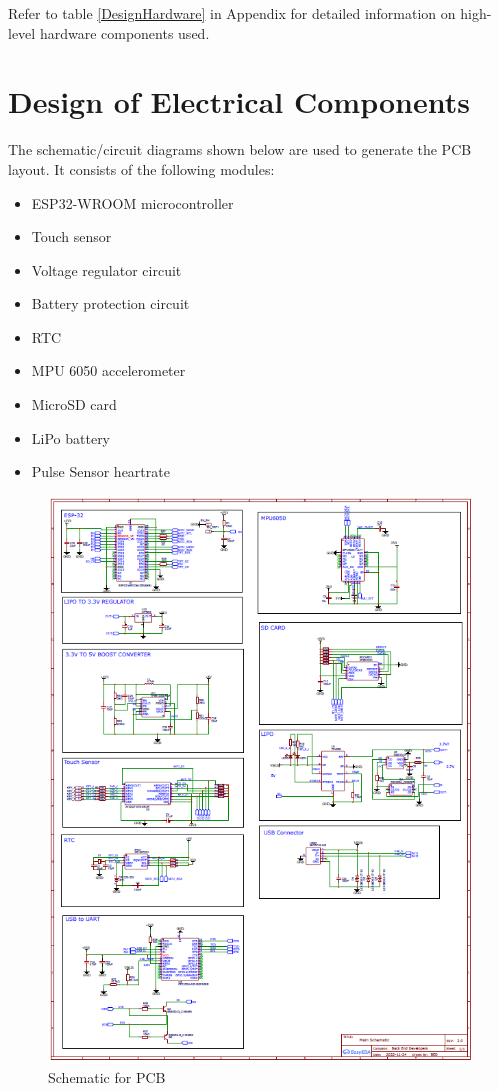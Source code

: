 \documentclass[12pt, titlepage]{article}
\begin{document}
Refer to table \ref{DesignHardware} in Appendix for detailed information on high-level hardware components used.

\section{Design of Electrical Components} \label{dEC}

The schematic/circuit diagrams shown below are used to generate the PCB layout. It consists of the following modules:
\begin{itemize}
\item ESP32-WROOM microcontroller
\item Touch sensor
\item Voltage regulator circuit
\item Battery protection circuit
\item RTC
\item MPU 6050 accelerometer
\item MicroSD card
\item LiPo battery
\item Pulse Sensor heartrate
\end{itemize}

\begin{figure}[H]
	\begin{center}
		 \includegraphics[width=1\textwidth]{Schematic}
		\caption{Schematic for PCB}
		\label{Schematic} 
	\end{center}
\end{figure}
\end{document}
